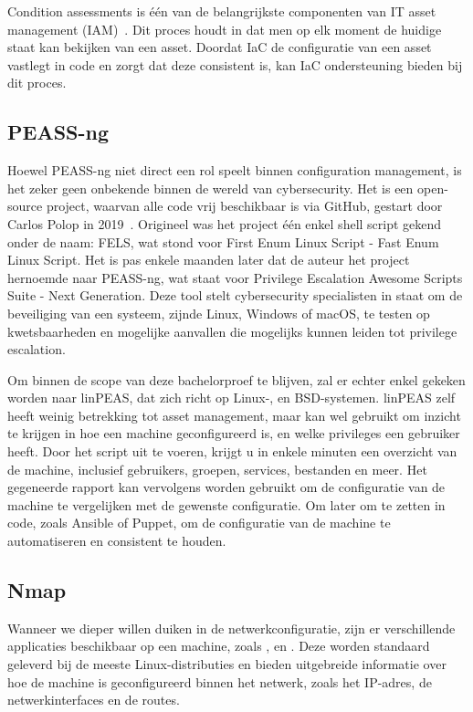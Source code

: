 Condition assessments is één van de belangrijkste componenten van IT asset management (IAM)~\autocite{ibm-what-is-iam}.
Dit proces houdt in dat men op elk moment de huidige staat kan bekijken van een asset.
Doordat IaC de configuratie van een asset vastlegt in code en zorgt dat deze consistent is, kan IaC ondersteuning bieden bij dit proces.

\subsection{PEASS-ng}
\label{sub:peass-ng}

Hoewel PEASS-ng niet direct een rol speelt binnen configuration management, is het zeker geen onbekende binnen de wereld van cybersecurity.
Het is een open-source project, waarvan alle code vrij beschikbaar is via GitHub, gestart door Carlos Polop in 2019~\autocite{peass-ng-github}.
Origineel was het project \'e\'en enkel shell script gekend onder de naam: FELS, wat stond voor First Enum Linux Script - Fast Enum Linux Script.
Het is pas enkele maanden later dat de auteur het project hernoemde naar PEASS-ng, wat staat voor Privilege Escalation Awesome Scripts Suite - Next Generation.
Deze tool stelt cybersecurity specialisten in staat om de beveiliging van een systeem, zijnde Linux, Windows of macOS, te testen op kwetsbaarheden en mogelijke aanvallen die mogelijks kunnen leiden tot privilege escalation.

Om binnen de scope van deze bachelorproef te blijven, zal er echter enkel gekeken worden naar linPEAS, dat zich richt op Linux-, en BSD-systemen.
linPEAS zelf heeft weinig betrekking tot asset management, maar kan wel gebruikt om inzicht te krijgen in hoe een machine geconfigureerd is, en welke privileges een gebruiker heeft.
Door het script uit te voeren, krijgt u in enkele minuten een overzicht van de machine, inclusief gebruikers, groepen, services, bestanden en meer.
Het gegeneerde rapport kan vervolgens worden gebruikt om de configuratie van de machine te vergelijken met de gewenste configuratie.
Om later om te zetten in code, zoals Ansible of Puppet, om de configuratie van de machine te automatiseren en consistent te houden.

\subsection{Nmap}
\label{sub:nmap}

Wanneer we dieper willen duiken in de netwerkconfiguratie, zijn er verschillende applicaties beschikbaar op een machine, zoals ,  en .
Deze worden standaard geleverd bij de meeste Linux-distributies en bieden uitgebreide informatie over hoe de machine is geconfigureerd binnen het netwerk, zoals het IP-adres, de netwerkinterfaces en de routes.


